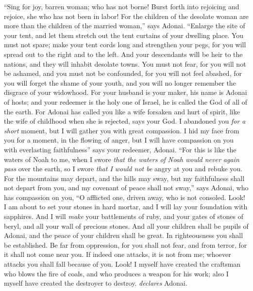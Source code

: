 \begin{biblechapter} %
 “Sing for joy, barren woman; who has not borne! 
Burst forth into rejoicing and rejoice, she who has not been in labor! 
For the children of the desolate woman are more than the children of the married woman,” says Adonai.
\verse “Enlarge the site of your tent, 
and let them stretch out the tent curtains of your dwelling place. 
You must not spare; make your tent cords long 
and strengthen your pegs,
\verse for you will spread out to the right and to the left. 
And your descendants will be heir to the nations, 
and they will inhabit desolate towns.
\verse You must not fear, for you will not be ashamed, 
and you must not be confounded, for you will not feel abashed, 
for you will forget the shame of your youth, 
and you will no longer remember the disgrace of your widowhood.
\verse For your husband is your maker, his name is Adonai of hosts; 
and your redeemer is the holy one of Israel, he is called the God of all of the earth.
\verse For Adonai has called you like a wife forsaken and hurt of spirit, 
like the wife of childhood when she is rejected, says your God.
\verse I abandoned you \textit{for a short} moment, 
but I will gather you with great compassion.
\verse I hid my face from you for a moment, in the flowing of anger, 
but I will have compassion on you with everlasting faithfulness” says your redeemer, Adonai.
\verse “For this is like the waters of Noah to me, 
when I swore \textit{that the waters of Noah would never again pass} over the earth, 
so I swore \textit{that I would not be} angry at you and rebuke you.
\verse For the mountains may depart, 
and the hills may sway, 
but my faithfulness shall not depart from you, 
and my covenant of peace shall not sway,” 
says Adonai, who has compassion on you,
\verse “O afflicted one, driven away, who is not consoled. 
Look! I am about to set your stones in hard mortar, 
and I will lay your foundation with sapphires.
\verse And I will \textit{make} your battlements of ruby, 
and your gates of stones of beryl, 
and all your wall of precious stones.
\verse And all your children shall be pupils of Adonai, 
and the peace of your children shall be great.
\verse In righteousness you shall be established.
\verse Be far from oppression, for you shall not fear, 
and from terror, for it shall not come near you.
\verse If indeed one attacks, it is not from me; 
whoever attacks you shall fall because of you.
\verse Look! I myself have created the craftsman who blows the fire of coals, 
and who produces a weapon for his work; 
also I myself have created the destroyer to destroy. \textit{declares} Adonai.
\end{biblechapter}


